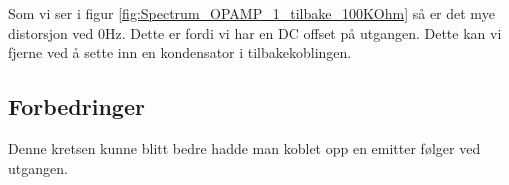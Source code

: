 Som vi ser i figur \ref{fig:Spectrum_OPAMP_1_tilbake_100KOhm} så er det mye distorsjon ved 0Hz. Dette er fordi vi har en DC offset på utgangen. Dette kan vi fjerne ved å sette inn en kondensator i tilbakekoblingen. 

\subsection{Forbedringer}
\label{forbedringer}
Denne kretsen kunne blitt bedre hadde man koblet opp en emitter følger ved utgangen.

